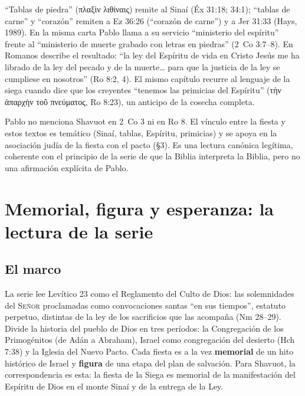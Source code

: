 \documentclass[11pt,letterpaper]{article}
\newcommand{\grc}[1]{\foreignlanguage{ancientgreek}{#1}}
\newcommand{\SENOR}{\textsc{Señor}}
\newcommand{\destacar}[1]{\textbf{\textcolor{tierraroja}{#1}}}
\begin{document}
``Tablas de piedra'' (\grc{πλαξὶν λιθίναις}) remite al Sinaí (Éx 31:18; 34:1); ``tablas de carne'' y ``corazón'' remiten a Ez 36:26 (``corazón de carne'') y a Jer 31:33 (Hays, 1989). En la misma carta Pablo llama a su servicio ``ministerio del espíritu'' frente al ``ministerio de muerte grabado con letras en piedras'' (2~Co 3:7--8). En Romanos describe el resultado: ``la ley del Espíritu de vida en Cristo Jesús me ha librado de la ley del pecado y de la muerte\ldots{} para que la justicia de la ley se cumpliese en nosotros'' (Ro 8:2, 4). El mismo capítulo recurre al lenguaje de la siega cuando dice que los creyentes ``tenemos las primicias del Espíritu'' (\grc{τὴν ἀπαρχὴν τοῦ πνεύματος}, Ro 8:23), un anticipo de la cosecha completa.

\begin{nota}[Precisión]
Pablo no menciona Shavuot en 2~Co 3 ni en Ro 8. El vínculo entre la fiesta y estos textos es temático (Sinaí, tablas, Espíritu, primicias) y se apoya en la asociación judía de la fiesta con el pacto (§3). Es una lectura canónica legítima, coherente con el principio de la serie de que la Biblia interpreta la Biblia, pero no una afirmación explícita de Pablo.
\end{nota}

\section{Memorial, figura y esperanza: la lectura de la serie}

\subsection{El marco}

La serie lee Levítico 23 como el Reglamento del Culto de Dios: las solemnidades del \SENOR{} proclamadas como convocaciones santas ``en sus tiempos'', estatuto perpetuo, distintas de la ley de los sacrificios que las acompaña (Nm 28--29). Divide la historia del pueblo de Dios en tres períodos: la Congregación de los Primogénitos (de Adán a Abraham), Israel como congregación del desierto (Hch 7:38) y la Iglesia del Nuevo Pacto. Cada fiesta es a la vez \destacar{memorial} de un hito histórico de Israel y \destacar{figura} de una etapa del plan de salvación. Para Shavuot, la correspondencia es esta: la fiesta de la Siega es memorial de la manifestación del Espíritu de Dios en el monte Sinaí y de la entrega de la Ley.
\end{document}
